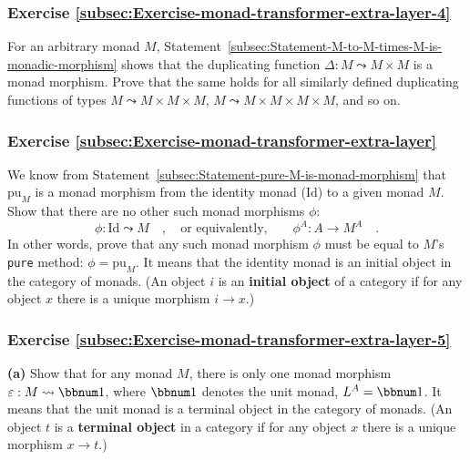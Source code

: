 \subsubsection{Exercise \label{subsec:Exercise-monad-transformer-extra-layer-4}\ref{subsec:Exercise-monad-transformer-extra-layer-4} }

For an arbitrary monad $M$, Statement~\ref{subsec:Statement-M-to-M-times-M-is-monadic-morphism}
shows that the duplicating function $\Delta:M\leadsto M\times M$
is a monad morphism. Prove that the same holds for all similarly defined
duplicating functions of types $M\leadsto M\times M\times M$, $M\leadsto M\times M\times M\times M$,
and so on.

\subsubsection{Exercise \label{subsec:Exercise-monad-transformer-extra-layer}\ref{subsec:Exercise-monad-transformer-extra-layer}}

We know from Statement~\ref{subsec:Statement-pure-M-is-monad-morphism}
that $\text{pu}_{M}$ is a monad morphism from the identity monad
($\text{Id}$) to a given monad $M$. Show that there are no other
such monad morphisms $\phi$:
\[
\phi:\text{Id}\leadsto M\quad,\quad\text{or equivalently,}\quad\quad\phi^{A}:A\rightarrow M^{A}\quad.
\]
In other words, prove that any such monad morphism $\phi$ must be
equal to $M$\textsf{'}s \lstinline!pure! method: $\phi=\text{pu}_{M}$. It
means that the identity monad is an initial object
in the category of monads. (An object $i$ is an \textbf{initial object}
of a category if for any object $x$ there is a unique morphism $i\rightarrow x$.)

\subsubsection{Exercise \label{subsec:Exercise-monad-transformer-extra-layer-5}\ref{subsec:Exercise-monad-transformer-extra-layer-5}}

\textbf{(a)} Show that for any monad $M$, there is only one monad
morphism $\varepsilon:M\leadsto\bbnum 1$, where $\bbnum 1$ denotes
the unit monad, $L^{A}=\bbnum 1$. It means that the unit monad is
a terminal object in the category of monads. (An object $t$ is a
\textbf{terminal object} in a category if for any object $x$ there
is a unique morphism $x\rightarrow t$.)

